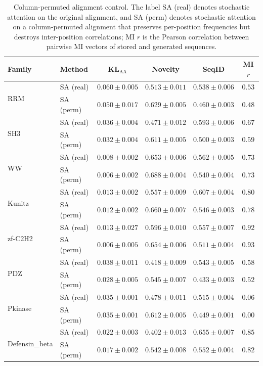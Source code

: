 \documentclass[10pt]{article}
\begin{document}
\begin{table}[ht]
\centering
\caption{Column-permuted alignment control. The label SA (real) denotes stochastic attention on the original alignment, and SA (perm) denotes stochastic attention on a column-permuted alignment that preserves per-position frequencies but destroys inter-position correlations; MI $r$ is the Pearson correlation between pairwise MI vectors of stored and generated sequences.}
\label{tab:permuted-alignment}
\small
\begin{tabular}{@{}llcccc@{}}
\toprule
Family & Method & KL$_{\mathrm{AA}}$ & Novelty & SeqID & MI $r$ \\
\midrule
\multirow{2}{*}{RRM}
 & SA (real) & $0.060 \pm 0.005$ & $0.513 \pm 0.011$ & $0.538 \pm 0.006$ & $0.53$ \\
 & SA (perm) & $0.050 \pm 0.017$ & $0.629 \pm 0.005$ & $0.460 \pm 0.003$ & $0.48$ \\
\midrule
\multirow{2}{*}{SH3}
 & SA (real) & $0.036 \pm 0.004$ & $0.471 \pm 0.012$ & $0.593 \pm 0.006$ & $0.67$ \\
 & SA (perm) & $0.032 \pm 0.004$ & $0.611 \pm 0.005$ & $0.500 \pm 0.003$ & $0.59$ \\
\midrule
\multirow{2}{*}{WW}
 & SA (real) & $0.008 \pm 0.002$ & $0.653 \pm 0.006$ & $0.562 \pm 0.005$ & $0.73$ \\
 & SA (perm) & $0.006 \pm 0.002$ & $0.688 \pm 0.004$ & $0.540 \pm 0.004$ & $0.73$ \\
\midrule
\multirow{2}{*}{Kunitz}
 & SA (real) & $0.013 \pm 0.002$ & $0.557 \pm 0.009$ & $0.607 \pm 0.004$ & $0.80$ \\
 & SA (perm) & $0.012 \pm 0.002$ & $0.660 \pm 0.007$ & $0.546 \pm 0.003$ & $0.78$ \\
\midrule
\multirow{2}{*}{zf-C2H2}
 & SA (real) & $0.013 \pm 0.027$ & $0.596 \pm 0.010$ & $0.557 \pm 0.007$ & $0.92$ \\
 & SA (perm) & $0.006 \pm 0.005$ & $0.654 \pm 0.006$ & $0.511 \pm 0.004$ & $0.93$ \\
\midrule
\multirow{2}{*}{PDZ}
 & SA (real) & $0.038 \pm 0.011$ & $0.418 \pm 0.009$ & $0.543 \pm 0.005$ & $0.58$ \\
 & SA (perm) & $0.028 \pm 0.005$ & $0.545 \pm 0.007$ & $0.433 \pm 0.003$ & $0.52$ \\
\midrule
\multirow{2}{*}{Pkinase}
 & SA (real) & $0.035 \pm 0.001$ & $0.478 \pm 0.011$ & $0.515 \pm 0.004$ & $0.06$ \\
 & SA (perm) & $0.035 \pm 0.001$ & $0.612 \pm 0.005$ & $0.449 \pm 0.001$ & $0.00$ \\
\midrule
\multirow{2}{*}{Defensin\_beta}
 & SA (real) & $0.022 \pm 0.003$ & $0.402 \pm 0.013$ & $0.655 \pm 0.007$ & $0.85$ \\
 & SA (perm) & $0.017 \pm 0.002$ & $0.542 \pm 0.008$ & $0.552 \pm 0.004$ & $0.82$ \\
\bottomrule
\end{tabular}
\end{table}
\end{document}
